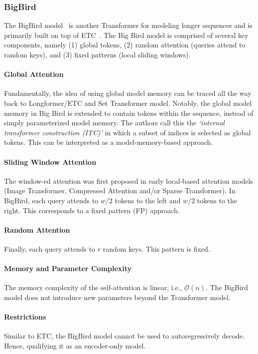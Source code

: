 \subsubsection{BigBird}
The BigBird model~\citep{zaheer2020big} is another Transformer for modeling longer sequences and is primarily built on top of ETC~\citep{ainslie2020etc}. The Big Bird model is comprised of several key components, namely (1) global tokens, (2) random attention (queries attend to random keys), and (3) fixed patterns (local sliding windows). 

\paragraph{Global Attention} Fundamentally, the idea of using global model memory can be traced all the way back to Longformer/ETC and Set Transformer model.  Notably, the global model memory in Big Bird is extended to contain tokens within the sequence, instead of simply parameterized model memory. The authors call this the \textit{`internal transformer construction (ITC)'} in which a subset of indices is selected as global tokens. This can be interpreted as a model-memory-based approach. 

\paragraph{Sliding Window Attention} The window-ed attention was first proposed in early local-based attention models (Image Transformer, Compressed Attention and/or Sparse Transformer). In BigBird, each query attends to $w/2$ tokens to the left and $w/2$ tokens to the right. This corresponds to a fixed pattern (FP) approach.

\paragraph{Random Attention} Finally, each query attends to $r$ random keys. This pattern is fixed. 

\paragraph{Memory and Parameter Complexity} The memory complexity of the self-attention is linear, i.e., $\mathcal{O}(n)$. The BigBird model does not introduce new parameters beyond the Transformer model. 

\paragraph{Restrictions} Similar to ETC, the BigBird model cannot be used to autoregressively decode. Hence, qualifying it as an encoder-only model.

